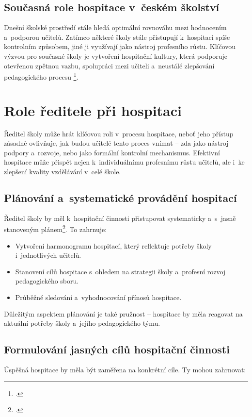 \subsection{Současná role hospitace v~českém školství}

Dnešní školské prostředí stále hledá optimální rovnováhu mezi hodnocením a~podporou učitelů. Zatímco některé školy stále přistupují k~hospitaci spíše kontrolním způsobem, jiné ji využívají jako nástroj profesního růstu. Klíčovou výzvou pro současné školy je vytvoření hospitační kultury, která podporuje otevřenou zpětnou vazbu, spolupráci mezi učiteli a~neustálé zlepšování pedagogického procesu \footcite[120]{ped-proces-rizeni}.


\section{Role ředitele při hospitaci}

Ředitel školy může hrát klíčovou roli v~procesu hospitace, neboť jeho přístup zásadně ovlivňuje, jak budou učitelé tento proces vnímat – zda jako nástroj podpory a~rozvoje, nebo jako formální kontrolní mechanismus. Efektivní hospitace může přispět nejen k~individuálnímu profesnímu růstu učitelů, ale i~ke zlepšení kvality vzdělávání v~celé škole.

\subsection{Plánování a~systematické provádění hospitací}
Ředitel školy by měl k~hospitační činnosti přistupovat systematicky a~s~jasně stanoveným plánem\footcite[124]{ped-proces-rizeni}. To zahrnuje:

\begin{itemize}
    \item Vytvoření harmonogramu hospitací, který reflektuje potřeby školy i~jednotlivých učitelů.
    \item Stanovení cílů hospitace s~ohledem na strategii školy a~profesní rozvoj pedagogického sboru.
    \item Průběžné sledování a~vyhodnocování přínosů hospitace.
\end{itemize}

Důležitým aspektem plánování je také pružnost – hospitace by měla reagovat na aktuální potřeby školy a~jejího pedagogického týmu.

\subsection{Formulování jasných cílů hospitační činnosti}
Úspěšná hospitace by měla být zaměřena na konkrétní cíle. Ty mohou zahrnovat:

